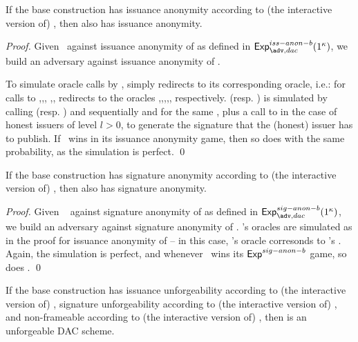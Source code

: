 \begin{theorem}
  If the base \CUASGenInt construction has issuance anonymity according to
  (the interactive version of) , then \CUASDAC
  also has issuance anonymity.
\end{theorem}

\begin{proof}
  Given \adv~against issuance anonymity of \CUASDAC as defined in
  $\Exp^{iss-anon-b}_{\adv,dac}(1^\secpar)$, we build an adversary \advB against
  issuance anonymity of \CUASGenInt.

  To simulate oracle calls by \adv, \advB simply redirects to its corresponding
  oracle, i.e.: for calls to ,,,
  ,, \advB redirects to the \CUASGenInt oracles
  \HUGEN,\CUGEN,\OBTAIN,\SIGN,\OBTCHALb, respectively.  (resp.
  ) is simulated by calling \HUGEN (resp. \CUGEN) and \ISET
  sequentially and for the same \uid, plus a call to \SIGN in the case of
  honest issuers of level $l>0$, to generate the signature \Sig that the
  (honest) issuer has to publish.
  If \adv~wins in its issuance anonymity game, then so does \advB with the same
  probability, as the simulation is perfect.
  \qed
\end{proof}

\begin{theorem}
  If the base \CUASGenInt construction has signature anonymity according to
  (the interactive version of) , then \CUASDAC
  also has signature anonymity.
\end{theorem}

\begin{proof}
  Given \adv~ against signature anonymity of \CUASDAC as defined in
  $\Exp^{sig-anon-b}_{\adv,dac}(1^\secpar)$, we build an adversary \advB against
  signature anonymity of \CUASGenInt.
  \adv's oracles are simulated as in the proof for issuance anonymity of
  \CUASDAC -- in this case, \adv's  oracle corresonds to \advB's
  \CHALb. Again, the simulation is perfect, and whenever \adv~wins its
  $\mathsf{Exp}^{sig-anon-b}$ game, so does \advB.
  \qed
\end{proof}

\begin{theorem}
  If the base \CUASGenInt construction has issuance unforgeability according to
  (the interactive version of) , signature
  unforgeability according to (the interactive version of)
  , and non-frameable according to (the interactive
  version of) , then \CUASDAC is an unforgeable DAC
  scheme.
\end{theorem}

